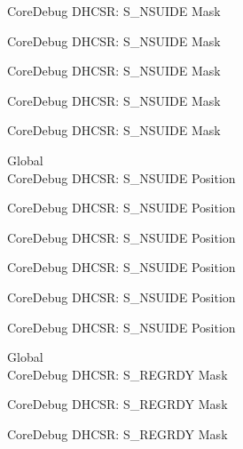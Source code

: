 \begin{DoxyRefList}
\label{deprecated__deprecated000469}%
%
Core\+Debug DHCSR\+: S\+\_\+\+NSUIDE Mask 

\label{deprecated__deprecated000571}%
%
Core\+Debug DHCSR\+: S\+\_\+\+NSUIDE Mask 

\label{deprecated__deprecated000696}%
%
Core\+Debug DHCSR\+: S\+\_\+\+NSUIDE Mask 

\label{deprecated__deprecated001147}%
%
Core\+Debug DHCSR\+: S\+\_\+\+NSUIDE Mask 

\label{deprecated__deprecated001249}%
%
Core\+Debug DHCSR\+: S\+\_\+\+NSUIDE Mask  
\item[Global \doxylink{group___c_m_s_i_s___s_c_b_ga59e228c682eec72e892b2ce018afe477}{Core\+Debug\+\_\+\+DHCSR\+\_\+\+S\+\_\+\+NSUIDE\+\_\+\+Pos} ]\hfill \\
\label{deprecated__deprecated000017}%
%
Core\+Debug DHCSR\+: S\+\_\+\+NSUIDE Position 

\label{deprecated__deprecated000468}%
%
Core\+Debug DHCSR\+: S\+\_\+\+NSUIDE Position 

\label{deprecated__deprecated000570}%
%
Core\+Debug DHCSR\+: S\+\_\+\+NSUIDE Position 

\label{deprecated__deprecated000695}%
%
Core\+Debug DHCSR\+: S\+\_\+\+NSUIDE Position 

\label{deprecated__deprecated001146}%
%
Core\+Debug DHCSR\+: S\+\_\+\+NSUIDE Position 

\label{deprecated__deprecated001248}%
%
Core\+Debug DHCSR\+: S\+\_\+\+NSUIDE Position  
\item[Global \doxylink{group___c_m_s_i_s___core_debug_gac4cd6f3178de48f473d8903e8c847c07}{Core\+Debug\+\_\+\+DHCSR\+\_\+\+S\+\_\+\+REGRDY\+\_\+\+Msk} ]\hfill \\
\label{deprecated__deprecated000028}%
%
Core\+Debug DHCSR\+: S\+\_\+\+REGRDY Mask 

\label{deprecated__deprecated000120}%
%
Core\+Debug DHCSR\+: S\+\_\+\+REGRDY Mask 

\label{deprecated__deprecated000174}%
%
Core\+Debug DHCSR\+: S\+\_\+\+REGRDY Mask 


\end{DoxyRefList}

